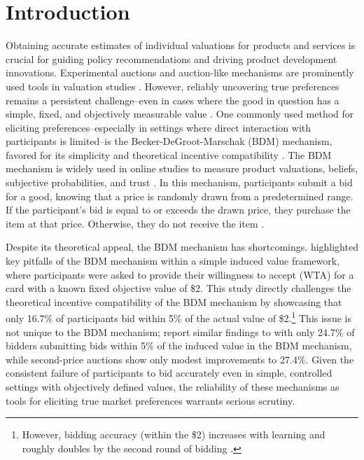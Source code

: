 \documentclass[12pt]{article}
\begin{document}
\section{Introduction}
Obtaining accurate estimates of individual valuations for products and services is crucial for guiding policy recommendations and driving product development innovations. Experimental auctions and auction-like mechanisms are prominently used tools in valuation studies \citep{lusk2007experimental,canavari2019run}. However, reliably uncovering true preferences remains a persistent challenge--even in cases where the good in question has a simple, fixed, and objectively measurable value \citep{drichoutis2022game, cason_misconceptions_2014}. One commonly used method for eliciting preferences--especially in settings where direct interaction with participants is limited--is the Becker-DeGroot-Marschak (BDM) mechanism,  favored for its simplicity and theoretical incentive compatibility \citep{mamadehussene2023reliability, azrieli2018incentives}. The BDM mechanism is widely used in online studies to measure product valuations, beliefs, subjective probabilities, and trust  \citep{mamadehussene2023reliability, ahles_testing_2024, burdea2022online}. In this mechanism, participants submit a bid for a good, knowing that a price is randomly drawn from a predetermined range. If the participant's bid is equal to or exceeds the drawn price, they purchase the item at that price. Otherwise, they do not receive the item \citep{becker_measuring_1964}.

Despite its theoretical appeal, the BDM mechanism has shortcomings. 
\citet{cason_misconceptions_2014} highlighted key pitfalls of the BDM mechanism within a simple induced value framework, where participants were asked to provide their willingness to accept (WTA) for a card with a known fixed objective value of \$2. This study directly challenges the theoretical incentive compatibility of the BDM mechanism by showcasing that only 16.7\% of participants bid within 5\% of the actual value of \$2.\footnote{However, bidding accuracy (within the \$2) increases with learning and roughly doubles by the second round of bidding \cite{cason_misconceptions_2014}.} This issue is not unique to the BDM mechanism; \citet{DrichoutisEtAl2024incentives} report similar findings to \citet{cason_misconceptions_2014} with only 24.7\% of bidders submitting bids within 5\% of the induced value in the BDM mechanism, while second-price auctions show only modest improvements to 27.4\%. Given the consistent failure of participants to bid accurately even in simple, controlled settings with objectively defined values, the reliability of these mechanisms as tools for eliciting true market preferences warrants serious scrutiny.
\end{document}
